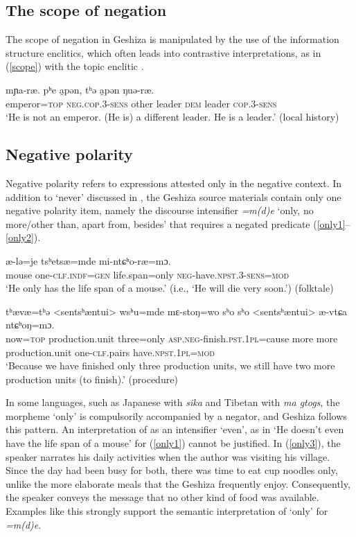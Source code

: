 \documentclass[output=paper,colorlinks,citecolor=brown]{langscibook}
\begin{document}
\subsection{The scope of negation}
The scope of negation in Geshiza is manipulated by the use of the information structure enclitics, which often leads into contrastive interpretations, as in (\ref{scope}) with the topic enclitic .

\ea
\label{scope}
 {mɲa-ræ}. {pʰe} {a̯pən}, {tʰə} {a̯pən} {ŋuə-ræ.}\\ 
emperor=\textsc{top} \textsc{neg.cop}.3-\textsc{sens} other leader \textsc{dem} leader \textsc{cop}.3-\textsc{sens}\\
\glt `He is not an emperor. (He is) a different leader. He is a leader.' (local history)
\z

\subsection{Negative polarity}
Negative polarity refers to expressions attested only in the negative context. In addition to  `never' discussed in , the Geshiza source materials contain only one negative polarity item, namely the  discourse intensifier \textit{=m(d)e} `only, no more/other than, apart from, besides’ that requires a negated predicate (\ref{only1}--\ref{only2}). 

\ea
\label{only1}
 		{æ-lə=je} 					{tsʰetsæ=mde} 		{mi-ntɕʰo-ræ=mɔ}.\\ 
    mouse		one-\textsc{clf.indf=gen}		life.span=only  \textsc{neg}-have.\textsc{npst.}3-\textsc{sens=mod}\\
\glt `He only has the life span of a mouse.' (i.e., `He will die very soon.') (folktale) 
\z

\ea
\label{only2}
\gll  
{tʰævæ=tʰə} {<sentsʰæntui>} 	{wsʰu=mde}		{mɛ-stoŋ=wo} 	{sʰo} 			{sʰo}		{<sentsʰæntui>} 	{æ-vtɕa}	{ntɕʰoŋ=mɔ.}\\ 
    			now=\textsc{top} production.unit	three=only	\textsc{asp.neg}-finish.\textsc{pst.1pl}=cause	more    more
    			production.unit	one-\textsc{clf}.pairs		have.\textsc{npst.1pl=mod}\\
\glt `Because we have finished only three production units, we still have two more production units (to finish).' (procedure)
\z

In some languages, such as Japanese with \textit{sika} and Tibetan with \textit{ma gtogs}, the morpheme `only' is compulsorily accompanied by a negator, and Geshiza follows this pattern. An interpretation of  as an intensifier `even', as in `He doesn't even have the life span of a mouse' for (\ref{only1}) cannot be justified. In (\ref{only3}), the speaker narrates his daily activities when the author was visiting his village. Since the day had been busy for both, there was time to eat cup noodles only, unlike the more elaborate meals that the Geshiza frequently enjoy. Consequently, the speaker conveys the message that no other kind of food was available. Examples like this strongly support the semantic interpretation of `only' for \textit{=m(d)e}.
\end{document}
